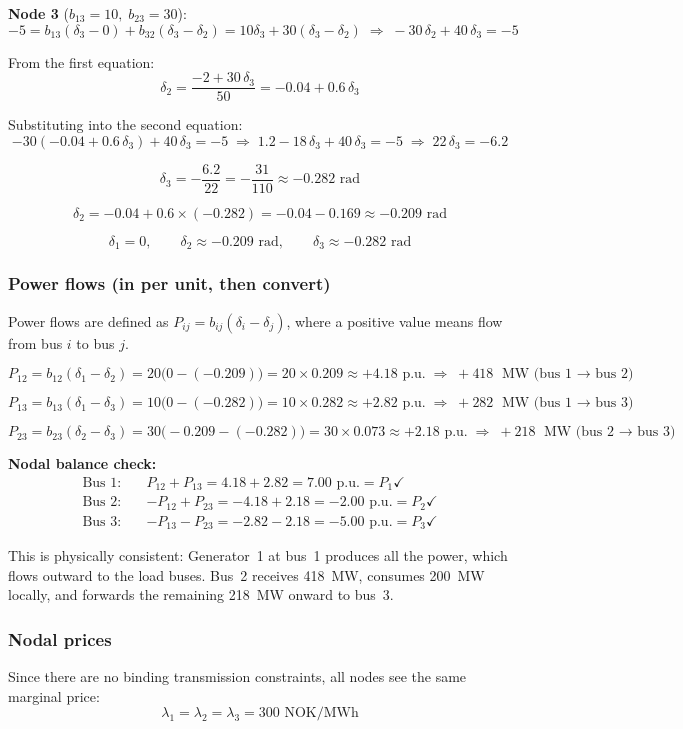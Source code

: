 \textbf{Node 3} ($b_{13}=10,\; b_{23}=30$):
\[
  -5 = b_{13}(\delta_3 - 0) + b_{32}(\delta_3 - \delta_2)
     = 10\delta_3 + 30(\delta_3 - \delta_2)
  \;\Rightarrow\; -30\,\delta_2 + 40\,\delta_3 = -5
\]

From the first equation:
\[
  \delta_2 = \frac{-2 + 30\,\delta_3}{50} = -0.04 + 0.6\,\delta_3
\]

Substituting into the second equation:
\[
  -30\!\left(-0.04 + 0.6\,\delta_3\right) + 40\,\delta_3 = -5
  \;\Rightarrow\; 1.2 - 18\,\delta_3 + 40\,\delta_3 = -5
  \;\Rightarrow\; 22\,\delta_3 = -6.2
\]

\[
  \delta_3 = -\frac{6.2}{22} = -\frac{31}{110} \approx -0.282 \text{ rad}
\]

\[
  \delta_2 = -0.04 + 0.6\times(-0.282) = -0.04 - 0.169 \approx -0.209 \text{ rad}
\]

\[
  \delta_1 = 0, \qquad \delta_2 \approx -0.209 \text{ rad}, \qquad \delta_3 \approx -0.282 \text{ rad}
\]

\subsubsection*{Power flows (in per unit, then convert)}

Power flows are defined as $P_{ij} = b_{ij}(\delta_i - \delta_j)$, where a positive
value means flow from bus $i$ to bus $j$.

\[
  P_{12} = b_{12}(\delta_1 - \delta_2) = 20\bigl(0 - (-0.209)\bigr)
         = 20 \times 0.209 \approx +4.18 \text{ p.u.}
         \;\Rightarrow\; +418 \text{ MW (bus 1 $\to$ bus 2)}
\]

\[
  P_{13} = b_{13}(\delta_1 - \delta_3) = 10\bigl(0 - (-0.282)\bigr)
         = 10 \times 0.282 \approx +2.82 \text{ p.u.}
         \;\Rightarrow\; +282 \text{ MW (bus 1 $\to$ bus 3)}
\]

\[
  P_{23} = b_{23}(\delta_2 - \delta_3) = 30\bigl(-0.209 - (-0.282)\bigr)
         = 30 \times 0.073 \approx +2.18 \text{ p.u.}
         \;\Rightarrow\; +218 \text{ MW (bus 2 $\to$ bus 3)}
\]

\noindent\textbf{Nodal balance check:}
\begin{align*}
  \text{Bus 1:} &\quad P_{12} + P_{13} = 4.18 + 2.82 = 7.00 \text{ p.u.} = P_1 \checkmark \\
  \text{Bus 2:} &\quad {-P_{12}} + P_{23} = -4.18 + 2.18 = -2.00 \text{ p.u.} = P_2 \checkmark \\
  \text{Bus 3:} &\quad {-P_{13}} - P_{23} = -2.82 - 2.18 = -5.00 \text{ p.u.} = P_3 \checkmark
\end{align*}

This is physically consistent: Generator~1 at bus~1 produces all the power, which
flows outward to the load buses. Bus~2 receives 418~MW, consumes 200~MW locally,
and forwards the remaining 218~MW onward to bus~3.

\subsubsection*{Nodal prices}

Since there are no binding transmission constraints, all nodes see the same
marginal price:
\[
  \lambda_1 = \lambda_2 = \lambda_3 = 300 \text{ NOK/MWh}
\]
